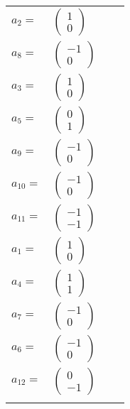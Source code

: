 \documentclass[1p]{elsarticle_modified}
\theoremstyle{definition}
\begin{document}
\begin{tabular}{m{7pt} m{180pt} m{7pt} m{180pt} }
\flushright $a_{2}=$&$\begin{pmatrix}1\\0\end{pmatrix}$ \\
\flushright $a_{8}=$&$\begin{pmatrix}-1\\0\end{pmatrix}$ \\
\flushright $a_{3}=$&$\begin{pmatrix}1\\0\end{pmatrix}$ \\
\flushright $a_{5}=$&$\begin{pmatrix}0\\1\end{pmatrix}$ \\
\flushright $a_{9}=$&$\begin{pmatrix}-1\\0\end{pmatrix}$ \\
\flushright $a_{10}=$&$\begin{pmatrix}-1\\0\end{pmatrix}$ \\
\flushright $a_{11}=$&$\begin{pmatrix}-1\\-1\end{pmatrix}$ \\
\flushright $a_{1}=$&$\begin{pmatrix}1\\0\end{pmatrix}$ \\
\flushright $a_{4}=$&$\begin{pmatrix}1\\1\end{pmatrix}$ \\
\flushright $a_{7}=$&$\begin{pmatrix}-1\\0\end{pmatrix}$ \\
\flushright $a_{6}=$&$\begin{pmatrix}-1\\0\end{pmatrix}$ \\
\flushright $a_{12}=$&$\begin{pmatrix}0\\-1\end{pmatrix}$\\&\end{tabular}
\end{document}
